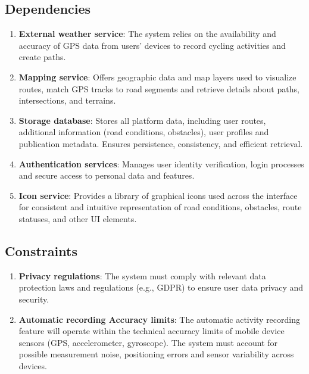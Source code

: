 \subsection{Dependencies}
    \begin{enumerate}[label=D\arabic*.]
        \item \textbf{External weather service}: The system relies on the availability and accuracy of GPS data from users' devices to record cycling activities and create paths.
        \item \textbf{Mapping service}: Offers geographic data and map layers used to visualize routes, match GPS tracks to road segments and retrieve details about paths, intersections, and terrains.
        \item \textbf{Storage database}: Stores all platform data, including user routes, additional information (road conditions, obstacles), user profiles and publication metadata. Ensures persistence, consistency, and efficient retrieval.
        \item \textbf{Authentication services}: Manages user identity verification, login processes and secure access to personal data and features.
        \item \textbf{Icon service}: Provides a library of graphical icons used across the interface for consistent and intuitive representation of road conditions, obstacles, route statuses, and other UI elements.
    \end{enumerate}
\subsection{Constraints}
    \begin{enumerate}[label=C\arabic*.]
        \item \textbf{Privacy regulations}: The system must comply with relevant data protection laws and regulations (e.g., GDPR) to ensure user data privacy and security.
        \item \textbf{Automatic recording Accuracy limits}: The automatic activity recording feature will operate within the technical accuracy limits of mobile device sensors (GPS, accelerometer, gyroscope). The system must account for possible measurement noise, positioning errors and sensor variability across devices.
    \end{enumerate}

